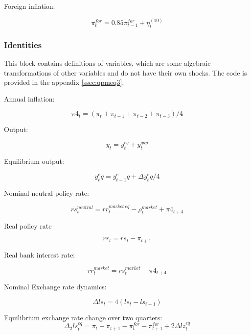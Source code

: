 \documentclass[12pt]{article}
\begin{document}
Foreign inflation:

\begin{equation}
	\pi^{for}_t = 0.85 \pi^{for}_{t-1} + \eta_t^{(10)}
\end{equation}

\subsubsection{Identities}

This block contains definitions of variables, which are some algebraic transformations of other variables and do not have their own shocks. The code is provided in the appendix \ref{ssec:qpmeq3}. 

Annual inflation:

\begin{equation}
	{\pi}4_t = (\pi_t + \pi_{t-1} + \pi_{t-2} + \pi_{t-3} ) / 4
\end{equation}

Output:

\begin{equation}
	y_t = y_t^{eq} + y_t^{gap}
\end{equation}

Equilibrium output:

\begin{equation}
	y_t^eq = y_{t-1}^eq + \Delta y_t^eq / 4
\end{equation}

Nominal neutral policy rate:

\begin{equation}
	rs_t^{neutral} = rr_t^{market~eq} - \rho_t^{market} + {\pi}4_{t+4}
\end{equation}

Real policy rate 

\begin{equation}
	rr_t = rs_t - \pi_{t+1}
\end{equation}

Real bank interest rate: 

\begin{equation}
	rr_t^{market} = rs_t^{market} - {\pi}4_{t+4}
\end{equation}

Nominal Exchange rate dynamics:

\begin{equation}
	\Delta ls_t = 4 (ls_t - ls_{t-1})
\end{equation}

Equilibrium exchange rate change over two quarters: 
\begin{equation}
	\Delta_2 ls_t^{eq} = \pi_t - \pi_{t+1} - \pi_t^{for} - \pi_{t+1}^{for} + 2 \Delta lz_t^{eq}
\end{equation}
\end{document}
